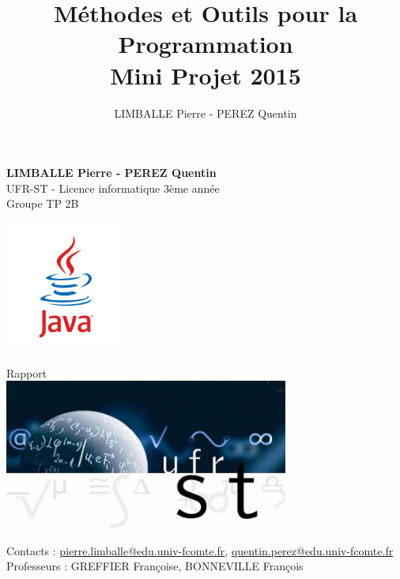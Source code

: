 \documentclass[a4paper,10pt]{article}
\begin{document}
\author{LIMBALLE Pierre - PEREZ Quentin}
\title{Méthodes et Outils pour la Programmation\\%
Mini Projet 2015}

    
\makeatletter
  \begin{titlepage}
  \centering
      {\LARGE \textbf{LIMBALLE Pierre - PEREZ Quentin}}\\
      UFR-ST - Licence informatique 3ème année\\Groupe TP 2B\\
    \vspace{2cm}
      {\LARGE \@date\\}
    \vspace{1cm}
        \includegraphics[width=0.3\textwidth]{java.png}\\
    \vspace{1em}
       {\LARGE \textbf{\@title}\\
    \vspace{1em}
       Rapport\\} 
    \vspace{2em}
    \vspace{1cm}
        \includegraphics[width=0.7\textwidth]{ufrst.jpg}\\
    \vspace{1.5cm}
      {Contacts : \href{mailto:pierre.limballe@edu.univ-fcomte.fr}{pierre.limballe@edu.univ-fcomte.fr}, \href{mailto:quentin.perez@edu.univ-fcomte.fr}{quentin.perez@edu.univ-fcomte.fr}\\Professeurs : GREFFIER Françoise, BONNEVILLE François}
    \vfill
  \end{titlepage}
\makeatother
\end{document}
